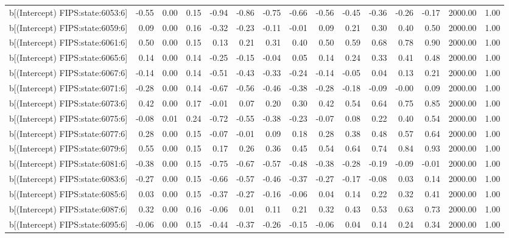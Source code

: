 \begin{table}[ht]
\begin{tabular}{rrrrrrrrrrrrrrr}
  b[(Intercept) FIPS:state:6053:6] & -0.55 & 0.00 & 0.15 & -0.94 & -0.86 & -0.75 & -0.66 & -0.56 & -0.45 & -0.36 & -0.26 & -0.17 & 2000.00 & 1.00 \\ 
  b[(Intercept) FIPS:state:6059:6] & 0.09 & 0.00 & 0.16 & -0.32 & -0.23 & -0.11 & -0.01 & 0.09 & 0.21 & 0.30 & 0.40 & 0.50 & 2000.00 & 1.00 \\ 
  b[(Intercept) FIPS:state:6061:6] & 0.50 & 0.00 & 0.15 & 0.13 & 0.21 & 0.31 & 0.40 & 0.50 & 0.59 & 0.68 & 0.78 & 0.90 & 2000.00 & 1.00 \\ 
  b[(Intercept) FIPS:state:6065:6] & 0.14 & 0.00 & 0.14 & -0.25 & -0.15 & -0.04 & 0.05 & 0.14 & 0.24 & 0.33 & 0.41 & 0.48 & 2000.00 & 1.00 \\ 
  b[(Intercept) FIPS:state:6067:6] & -0.14 & 0.00 & 0.14 & -0.51 & -0.43 & -0.33 & -0.24 & -0.14 & -0.05 & 0.04 & 0.13 & 0.21 & 2000.00 & 1.00 \\ 
  b[(Intercept) FIPS:state:6071:6] & -0.28 & 0.00 & 0.14 & -0.67 & -0.56 & -0.46 & -0.38 & -0.28 & -0.18 & -0.09 & -0.00 & 0.09 & 2000.00 & 1.00 \\ 
  b[(Intercept) FIPS:state:6073:6] & 0.42 & 0.00 & 0.17 & -0.01 & 0.07 & 0.20 & 0.30 & 0.42 & 0.54 & 0.64 & 0.75 & 0.85 & 2000.00 & 1.00 \\ 
  b[(Intercept) FIPS:state:6075:6] & -0.08 & 0.01 & 0.24 & -0.72 & -0.55 & -0.38 & -0.23 & -0.07 & 0.08 & 0.22 & 0.40 & 0.54 & 2000.00 & 1.00 \\ 
  b[(Intercept) FIPS:state:6077:6] & 0.28 & 0.00 & 0.15 & -0.07 & -0.01 & 0.09 & 0.18 & 0.28 & 0.38 & 0.48 & 0.57 & 0.64 & 2000.00 & 1.00 \\ 
  b[(Intercept) FIPS:state:6079:6] & 0.55 & 0.00 & 0.15 & 0.17 & 0.26 & 0.36 & 0.45 & 0.54 & 0.64 & 0.74 & 0.84 & 0.93 & 2000.00 & 1.00 \\ 
  b[(Intercept) FIPS:state:6081:6] & -0.38 & 0.00 & 0.15 & -0.75 & -0.67 & -0.57 & -0.48 & -0.38 & -0.28 & -0.19 & -0.09 & -0.01 & 2000.00 & 1.00 \\ 
  b[(Intercept) FIPS:state:6083:6] & -0.27 & 0.00 & 0.15 & -0.66 & -0.57 & -0.46 & -0.37 & -0.27 & -0.17 & -0.08 & 0.03 & 0.14 & 2000.00 & 1.00 \\ 
  b[(Intercept) FIPS:state:6085:6] & 0.03 & 0.00 & 0.15 & -0.37 & -0.27 & -0.16 & -0.06 & 0.04 & 0.14 & 0.22 & 0.32 & 0.41 & 2000.00 & 1.00 \\ 
  b[(Intercept) FIPS:state:6087:6] & 0.32 & 0.00 & 0.16 & -0.06 & 0.01 & 0.11 & 0.21 & 0.32 & 0.43 & 0.53 & 0.63 & 0.73 & 2000.00 & 1.00 \\ 
  b[(Intercept) FIPS:state:6095:6] & -0.06 & 0.00 & 0.15 & -0.44 & -0.37 & -0.26 & -0.15 & -0.06 & 0.04 & 0.14 & 0.24 & 0.34 & 2000.00 & 1.00 \\ 

\end{tabular}
\end{table}
